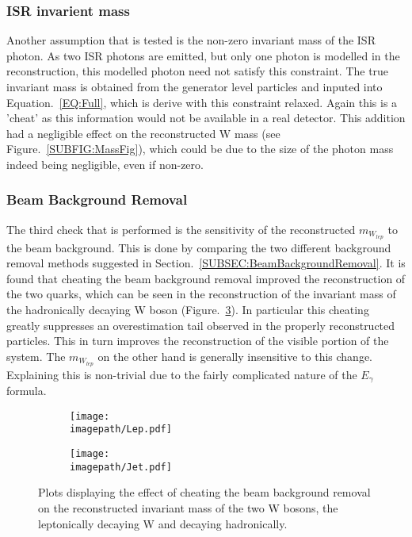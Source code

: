 \subsubsection{ISR invarient mass}
\label{SUBSUBSEC:ISRInvarientMass}
Another assumption that is tested is the non-zero invariant mass of the ISR photon. As two ISR photons are emitted, but only one photon is modelled in the reconstruction, this modelled photon need not satisfy this constraint. The true invariant mass is obtained from the generator level particles and inputed into Equation.~\ref{EQ:Full}, which is derive with this constraint relaxed. Again this is a 'cheat' as this information would not be available in a real detector. This addition had a negligible effect on the reconstructed W mass (see Figure.~\ref{SUBFIG:MassFig}), which could be due to the size of the photon mass indeed being negligible, even if non-zero.

\subsubsection{Beam Background Removal}
\label{SUBSUBSEC:BeamBackground}
The third check that is performed is the sensitivity of the reconstructed ${m}_{W_{lep}}$  to the beam background. This is done by comparing the two different background removal methods suggested in Section.~\ref{SUBSEC:BeamBackgroundRemoval}. It is found that cheating the beam background removal improved the reconstruction of the two quarks, which can be seen in the reconstruction of the invariant mass of the hadronically decaying W boson (Figure.~\ref{FIG:Cheat}). In particular this cheating greatly suppresses an overestimation tail observed in the properly reconstructed particles. This in turn improves the reconstruction of the visible portion of the system. The ${m}_{W_{lep}}$ on the other hand is generally insensitive to this change. Explaining this is non-trivial due to the fairly complicated nature of the $E_{\gamma}$ formula.
\begin{figure}
    \begin{subfigure}[t]{0.45\textwidth}
      \centering
      \texttt{[image: \\imagepath/Lep.pdf]}
      \caption{}
      \label{SUBFIG:CheatLep}
    \end{subfigure}
    \begin{subfigure}[t]{0.45\textwidth}
      \centering
      \texttt{[image: \\imagepath/Jet.pdf]}
      \caption{}
      \label{SUBFIG:CheatHad}
    \end{subfigure}
    \caption{
        Plots displaying the effect of cheating the beam background removal on the reconstructed invariant mass of the two W bosons,
         the leptonically decaying W and  decaying hadronically.
      }
    \label{FIG:Cheat}
\end{figure}

